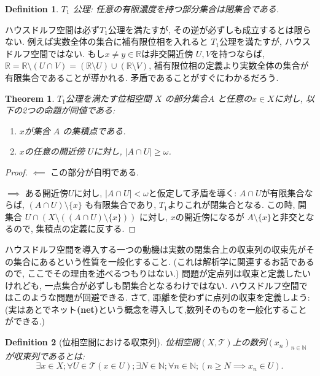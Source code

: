 \documentclass[dvipdfmx]{jbook}
\newtheorem{theorem}{Theorem}[section]
\newtheorem{definition}{Definition}[section]
\theoremstyle{remark}
\theoremstyle{plain}
\begin{document}
\begin{definition}
	$T_1$ 公理: 任意の有限濃度を持つ部分集合は閉集合である.
\end{definition}

ハウスドルフ空間は必ず$T_1$公理を満たすが, その逆が必ずしも成立するとは限らない.
例えば実数全体の集合に補有限位相を入れると $T_1$公理を満たすが, ハウスドルフ空間ではない. 
もし$x \neq y \in \mathbb{R}$は非交開近傍 $U,V$を持つならば,
$\mathbb{R} = \mathbb{R} \setminus \left( U \cap V \right) =\left( \mathbb{R} \setminus U \right) \cup \left( \mathbb{R} \setminus V \right) $, 補有限位相の定義より実数全体の集合が有限集合であることが導かれる.
矛盾であることがすぐにわかるだろう.

\begin{theorem}
	$T_1$公理を満たす位相空間 $X$ の部分集合$A$ と任意の$x \in X$に対し, 以下の2つの命題が同値である: 
	\begin{enumerate}
		\item $x$が集合 $A$ の集積点である.
		\item $x$の任意の開近傍 $U$に対し,  $|A\cap U| \ge \omega$.
	\end{enumerate}
\end{theorem}

\begin{proof}
	$\impliedby$ この部分が自明である.

	$\implies$ ある開近傍$U$に対し,  $ |  A \cap U | < \omega $と仮定して矛盾を導く: 
	$A\cap U$が有限集合ならば,  $\left( A \cap U \right) \setminus \{x\} $ も有限集合であり, $T_1$よりこれが閉集合となる. 
	この時, 開集合 $U\cap \left( X \setminus \left( \left( A \cap U \right)  \setminus \{ x\} \right) \right) $ に対し, $x $の開近傍になるが $A \setminus \{x\} $と非交となるので, 集積点の定義に反する.
\end{proof}

ハウスドルフ空間を導入する一つの動機は実数の閉集合上の収束列の収束先がその集合にあるという性質を一般化すること. 
(これは解析学に関連するお話であるので, ここでその理由を述べるつもりはない.)
問題が定点列は収束と定義したいけれども, 一点集合が必ずしも閉集合となるわけではない.
ハウスドルフ空間ではこのような問題が回避できる.
さて, 距離を使わずに点列の収束を定義しよう:(実はあとでネット\textbf{(net)}という概念を導入して,数列そのものを一般化することができる.)

 \begin{definition}[位相空間における収束列]
	位相空間$\left( X ,\mathcal{T} \right) $上の数列$\left( x_n \right) _{n \in \mathbb{N}}$が収束列であるとは:
	\[
	\exists x \in X ; \forall U \in \mathcal{T}\left( x \in U \right) ; \exists N \in \mathbb{N}; \forall n \in \mathbb{N}; \left( n \ge N \implies x_n \in U \right) 
	.\] 
\end{definition}
\end{document}
